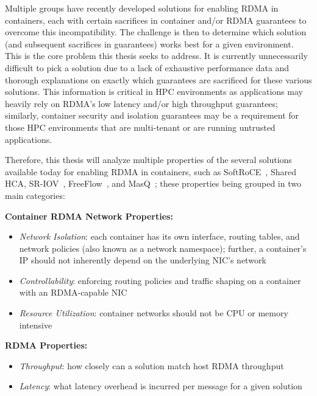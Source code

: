 \documentclass[12pt,titlepage]{article}
\begin{document}
Multiple groups have recently developed solutions for enabling RDMA in containers, each with certain sacrifices in container and/or RDMA guarantees to overcome this incompatibility.
The challenge is then to determine which solution (and subsequent sacrifices in guarantees) works best for a given environment.
This is the core problem this thesis seeks to address.
It is currently unnecessarily difficult to pick a solution due to a lack of exhaustive performance data and thorough explanations on exactly which guarantees are sacrificed for these various solutions.
This information is critical in HPC environments as applications may heavily rely on RDMA's low latency and/or high throughput guarantees; similarly, container security and isolation guarantees may be a requirement for those HPC environments that are multi-tenant or are running untrusted applications.

Therefore, this thesis will analyze multiple properties of the several solutions available today for enabling RDMA in containers, such as SoftRoCE~\cite{pandeysroce}, Shared HCA, SR-IOV~\cite{mellanoxdockerroce}, FreeFlow~\cite{kim2019freeflow}, and MasQ~\cite{he2020masq};
these properties being grouped in two main categories:

\noindent
\textbf{Container RDMA Network Properties:}
\begin{itemize}[nolistsep]
	\item \textit{Network Isolation}: each container has its own interface, routing tables, and network policies (also known as a network namespace); further, a container's IP should not inherently depend on the underlying NIC's network
	\item \textit{Controllability}: enforcing routing policies and traffic shaping on a container with an RDMA-capable NIC
	\item \textit{Resource Utilization}: container networks should not be CPU or memory intensive
\end{itemize}

\noindent
\textbf{RDMA Properties:}
\begin{itemize}[nolistsep]
	\item \textit{Throughput}: how closely can a solution match host RDMA throughput
	\item \textit{Latency}: what latency overhead is incurred per message for a given solution
\end{itemize}
\end{document}
